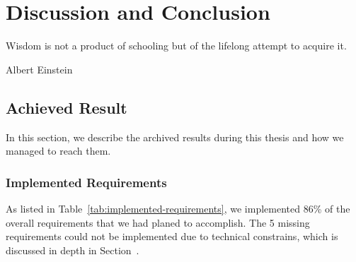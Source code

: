 \chapter{Discussion and Conclusion}
\epigraph{Wisdom is not a product of schooling but of the lifelong attempt to acquire it.}{Albert Einstein}
\section{Achieved Result}

In this section, we describe the archived results during this thesis and how we managed to reach them.

\subsection{Implemented Requirements}

As listed in Table~\ref{tab:implemented-requirements}, we implemented 86\% of the overall requirements that we had planed to accomplish. The 5 missing requirements could not be implemented due to technical constrains, which is discussed in depth in Section~.

